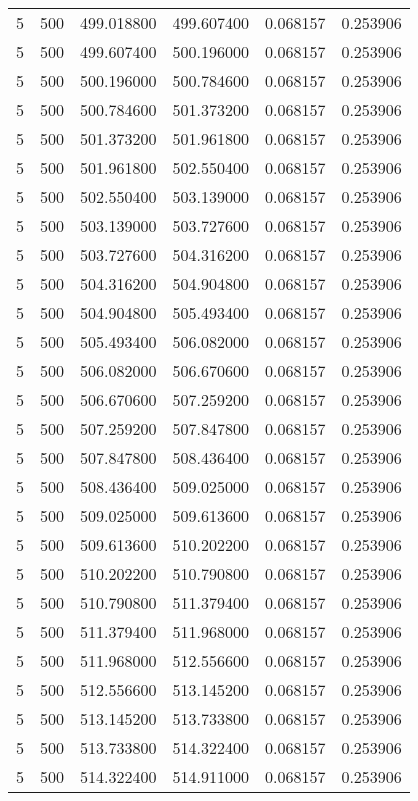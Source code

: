\begin{longtable}{rrrrrr}
5 & 500 & 499.018800 & 499.607400 & 0.068157 & 0.253906 \\
5 & 500 & 499.607400 & 500.196000 & 0.068157 & 0.253906 \\
5 & 500 & 500.196000 & 500.784600 & 0.068157 & 0.253906 \\
5 & 500 & 500.784600 & 501.373200 & 0.068157 & 0.253906 \\
5 & 500 & 501.373200 & 501.961800 & 0.068157 & 0.253906 \\
5 & 500 & 501.961800 & 502.550400 & 0.068157 & 0.253906 \\
5 & 500 & 502.550400 & 503.139000 & 0.068157 & 0.253906 \\
5 & 500 & 503.139000 & 503.727600 & 0.068157 & 0.253906 \\
5 & 500 & 503.727600 & 504.316200 & 0.068157 & 0.253906 \\
5 & 500 & 504.316200 & 504.904800 & 0.068157 & 0.253906 \\
5 & 500 & 504.904800 & 505.493400 & 0.068157 & 0.253906 \\
5 & 500 & 505.493400 & 506.082000 & 0.068157 & 0.253906 \\
5 & 500 & 506.082000 & 506.670600 & 0.068157 & 0.253906 \\
5 & 500 & 506.670600 & 507.259200 & 0.068157 & 0.253906 \\
5 & 500 & 507.259200 & 507.847800 & 0.068157 & 0.253906 \\
5 & 500 & 507.847800 & 508.436400 & 0.068157 & 0.253906 \\
5 & 500 & 508.436400 & 509.025000 & 0.068157 & 0.253906 \\
5 & 500 & 509.025000 & 509.613600 & 0.068157 & 0.253906 \\
5 & 500 & 509.613600 & 510.202200 & 0.068157 & 0.253906 \\
5 & 500 & 510.202200 & 510.790800 & 0.068157 & 0.253906 \\
5 & 500 & 510.790800 & 511.379400 & 0.068157 & 0.253906 \\
5 & 500 & 511.379400 & 511.968000 & 0.068157 & 0.253906 \\
5 & 500 & 511.968000 & 512.556600 & 0.068157 & 0.253906 \\
5 & 500 & 512.556600 & 513.145200 & 0.068157 & 0.253906 \\
5 & 500 & 513.145200 & 513.733800 & 0.068157 & 0.253906 \\
5 & 500 & 513.733800 & 514.322400 & 0.068157 & 0.253906 \\
5 & 500 & 514.322400 & 514.911000 & 0.068157 & 0.253906 \\

\end{longtable}
